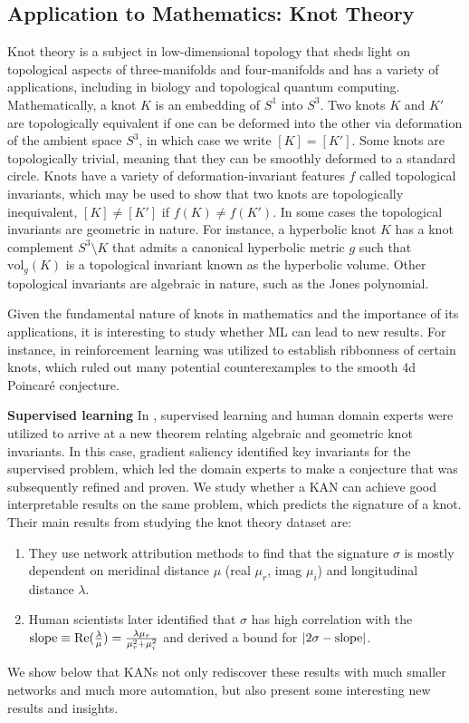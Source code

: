 \documentclass{article}
\numberwithin{equation}{section}
\numberwithin{figure}{section}
\begin{document}
\subsection{Application to Mathematics: Knot Theory}\label{subsec:knot}


Knot theory is a subject in low-dimensional topology that sheds light on topological aspects of three-manifolds and four-manifolds and has a variety of applications, including in biology and topological quantum computing. Mathematically, a knot $K$ is an embedding of $S^1$ into $S^3$. Two knots $K$ and $K'$ are topologically equivalent if one can be deformed into the other via deformation of the ambient space $S^3$, in which case we write $[K]=[K']$. Some knots are topologically trivial, meaning that they can be smoothly deformed to a standard circle. Knots have a variety of deformation-invariant features $f$ called topological invariants, which may be used to show that two knots are topologically inequivalent, $[K]\neq [K']$ if $f(K) \neq f(K')$. In some cases the topological invariants are geometric in nature. For instance, a hyperbolic knot $K$ has a knot complement $S^3\setminus K$ that admits a canonical hyperbolic metric $g$ such that $\text{vol}_g(K)$ is a topological invariant known as the hyperbolic volume. Other topological invariants are algebraic in nature, such as the Jones polynomial. 

Given the fundamental nature of knots in mathematics and the importance of its applications, it is interesting to study whether ML can lead to new results. For instance, in \cite{gukov2023searching} reinforcement learning was utilized to establish ribbonness of certain knots, which ruled out many potential counterexamples to the smooth 4d Poincar\'e conjecture.


{\bf Supervised learning} In \cite{davies2021advancing}, supervised learning and human domain experts were utilized to arrive at a new theorem relating algebraic and geometric knot invariants. In this case, gradient saliency identified key invariants for the supervised problem, which led the domain experts to make a conjecture that was subsequently refined and proven. We study whether a KAN can achieve good interpretable results on the same problem, which predicts the signature of a knot. Their main results from studying the knot theory dataset are: 
\begin{enumerate}[(1)]
    \item They use network attribution methods to find that the signature $\sigma$ is mostly dependent on meridinal distance $\mu$ (real $\mu_r$, imag $\mu_i$) and longitudinal distance $\lambda$.
    \item Human scientists later identified that $\sigma$ has high correlation with the ${\rm slope}\equiv {\rm Re}(\frac{\lambda}{\mu})=\frac{\lambda\mu_r}{\mu_r^2+\mu_i^2}$ and derived a bound for $|2\sigma-{\rm slope}|$.
\end{enumerate}
We show below that KANs not only rediscover these results with much smaller networks and much more automation, but also present some interesting new results and insights. 
\end{document}
